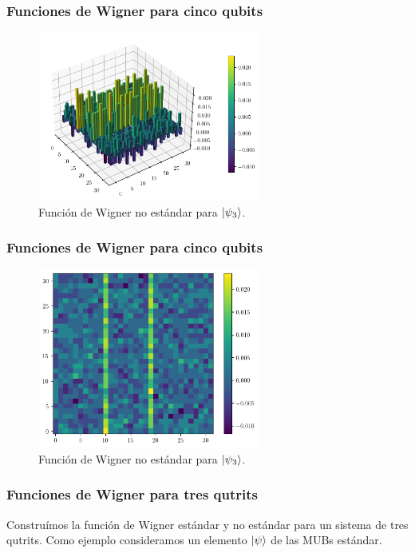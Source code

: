 \documentclass[10pt, spanish]{beamer}
\begin{document}
  \begin{frame}
    \frametitle{Funciones de Wigner para cinco qubits}

    \begin{figure}[h]
      \centering
      \includegraphics[width=0.65\textwidth]{
      imgs/wigner-kantor-2-5-s3.png}
      \caption{Función de Wigner no estándar para
      $\ket{\psi_3}$.}
      \label{fig:wigner-kantor-2-5-s3}
    \end{figure}
  \end{frame}

  \begin{frame}
    \frametitle{Funciones de Wigner para cinco qubits}

    \begin{figure}[h]
      \centering
      \includegraphics[width=0.65\textwidth]{
      imgs/wigner-kantor-2-5-s3-heat.png}
      \caption{Función de Wigner no estándar para
      $\ket{\psi_3}$.}
      \label{fig:wigner-kantor-2-5-s3-heat}
    \end{figure}
  \end{frame}

  \begin{frame}
    \frametitle{Funciones de Wigner para tres qutrits}

    Construímos la función de Wigner estándar y no estándar
    para un sistema de tres qutrits. Como ejemplo
    consideramos un elemento $\ket{\psi}$ de las MUBs
    estándar.
  \end{frame}
\end{document}
